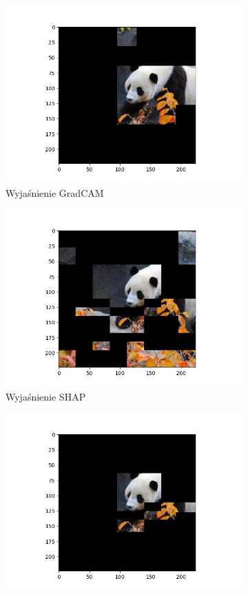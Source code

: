 \begin{figure}
	\centering
	\begin{subfigure}[b]{0.45\textwidth}
		\includegraphics[width=.9\textwidth]{img/examples/first_explanation}
		\caption{Wyjaśnienie GradCAM}  \label{}
	\end{subfigure}
	\begin{subfigure}[b]{0.45\textwidth}
		\centering\includegraphics[width=.9\textwidth]{img/examples/second_explanation}
		\caption{Wyjaśnienie SHAP}  \label{}
	\end{subfigure}
	\begin{subfigure}[b]{0.45\textwidth}
		\includegraphics[width=.9\textwidth]{img/examples/and_explanation}

\end{subfigure}
\end{figure}
